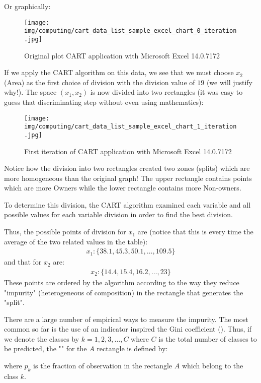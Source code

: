 	Or graphically:
	\begin{figure}[H]
		\centering
		\texttt{[image: img/computing/cart\_data\_list\_sample\_excel\_chart\_0\_iteration.jpg]}
		\caption[]{Original  plot CART application with Microsoft Excel 14.0.7172}
	\end{figure}
	If we apply the CART algorithm on this data, we see that we must choose $x_2$ (Area) as the first choice of division with the division value of $19$ (we will justify why!). The space $(x_1,x_2)$ is now divided into two rectangles (it was easy to guess that discriminating step without even using mathematics):
	\begin{figure}[H]
		\centering
		\texttt{[image: img/computing/cart\_data\_list\_sample\_excel\_chart\_1\_iteration.jpg]}
		\caption[]{First iteration of CART application with Microsoft Excel 14.0.7172}
	\end{figure}
	Notice how the division into two rectangles created two zones (splits) which are more homogeneous than the original graph! The upper rectangle contains points which are more Owners while the lower rectangle contains more Non-owners.

	To determine this division, the CART algorithm examined each variable and all possible values for each variable division in order to find the best division.

	Thus, the possible points of division for $x_1$ are (notice that this is every time the average of the two related values in the table):
	\begin{gather*}
		x_1:\{38.1,45.3,50.1,\ldots,109.5\}
	\end{gather*}
	and that for $x_2$ are:
	\begin{gather*}
		x_2:\{14.4,15.4,16.2,\ldots,23\}
	\end{gather*}
	These points are ordered by the algorithm according to the way they reduce "impurity" (heterogeneous of composition) in the rectangle that generates the "split".

	There are a large number of empirical ways to measure the impurity. The most common so far is the use of an indicator inspired the Gini coefficient (). Thus, if we denote the classes by $k=1,2,3,\ldots,C$ where $C$ is the total number of classes to be predicted, the "" for the $A$ rectangle is defined by:
	
	where $p_k$ is the fraction of observation in the rectangle $A$ which belong to the class $k$. 

